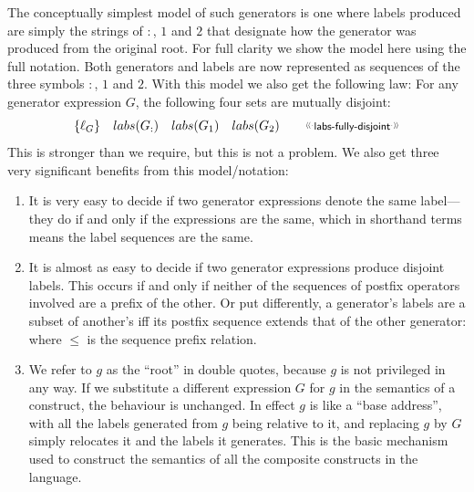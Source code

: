 The conceptually simplest model of such generators
is one where labels produced are simply the strings of $:$, $1$ and $2$
that designate how the generator was produced from the original root.
For full clarity we show the model here using the full notation.
Both generators and labels are now represented as sequences of the three symbols
$:$, $1$ and $2$.
With this model we also get the following law:
For any generator expression $G$,
the following four sets are mutually disjoint:
\[
  \setof{\ell_G}
  \quad
  labs(G_{:})
  \quad
  labs(G_1)
  \quad
  labs(G_2)
  \qquad
  \elabel{labs-fully-disjoint}
\]
This is stronger than we require, but this is not a problem.
We also get three very significant benefits from this model/notation:
\begin{enumerate}
  \item
    It is very easy to decide if two generator expressions
    denote the same label---they do if and only if the expressions are the
    same, which in shorthand terms means the label sequences are the same.
  \item
    It is almost as easy to decide if two generator expressions produce
    disjoint labels.
    This occurs if and only if neither of the sequences of postfix operators
    involved are a prefix of the other.
    Or put differently, a generator's labels are a subset of another's
    iff its postfix sequence extends that of the other generator:
    where $\leq$ is the sequence prefix relation.
  \item
    We refer to $g$ as the ``root'' in double quotes,
    because $g$ is not privileged in any way.
    If we substitute a different expression $G$ for $g$
    in the semantics of a construct,
    the behaviour is unchanged.
    In effect $g$ is like a ``base address'',
    with all the labels generated from $g$ being relative to it,
    and replacing $g$ by $G$ simply relocates it and the labels it generates.
    This is the basic mechanism used to construct the semantics
    of all the composite constructs in the language.
\end{enumerate}


